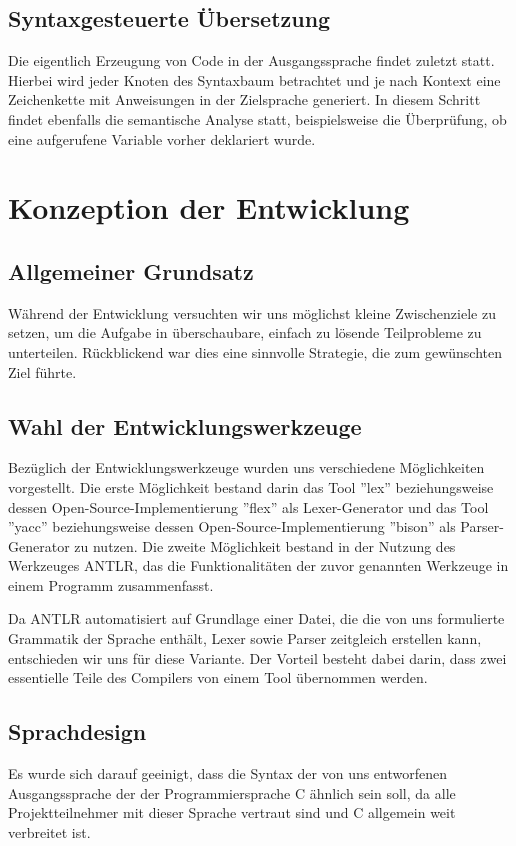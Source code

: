 \documentclass[12pt, a4paper, oneside, ngerman]{article}
\begin{document}
\subsection{Syntaxgesteuerte Übersetzung}
Die eigentlich Erzeugung von Code in der Ausgangssprache findet zuletzt statt. Hierbei wird jeder Knoten des Syntaxbaum betrachtet und je nach Kontext eine Zeichenkette mit Anweisungen in der Zielsprache generiert. In diesem Schritt findet ebenfalls die semantische Analyse statt, beispielsweise die Überprüfung, ob eine aufgerufene Variable vorher deklariert wurde.

\pagebreak
\section{Konzeption der Entwicklung}
\subsection{Allgemeiner Grundsatz}
Während der Entwicklung versuchten wir uns möglichst kleine Zwischenziele zu setzen, um die Aufgabe in überschaubare, einfach zu lösende Teilprobleme zu unterteilen. Rückblickend war dies eine sinnvolle Strategie, die zum gewünschten Ziel führte.

\subsection{Wahl der Entwicklungswerkzeuge}
Bezüglich der Entwicklungswerkzeuge wurden uns verschiedene Möglichkeiten vorgestellt. Die erste Möglichkeit bestand darin das Tool ''lex'' beziehungsweise dessen Open-Source-Implementierung ''flex'' als Lexer-Generator und das Tool ''yacc'' beziehungsweise dessen Open-Source-Implementierung ''bison'' als Parser-Generator zu nutzen. Die zweite Möglichkeit bestand in der Nutzung des Werkzeuges ANTLR, das die Funktionalitäten der zuvor genannten Werkzeuge in einem Programm zusammenfasst.

Da ANTLR automatisiert auf Grundlage einer Datei, die die von uns formulierte Grammatik der Sprache enthält, Lexer sowie Parser zeitgleich erstellen kann, entschieden wir uns für diese Variante. Der Vorteil besteht dabei darin, dass zwei essentielle Teile des Compilers von einem Tool übernommen werden. 

\subsection{Sprachdesign}
Es wurde sich darauf geeinigt, dass die Syntax der von uns entworfenen Ausgangssprache der der Programmiersprache C ähnlich sein soll, da alle Projektteilnehmer mit dieser Sprache vertraut sind und C allgemein weit verbreitet ist.
\end{document}
